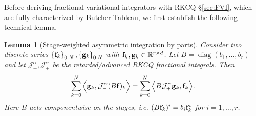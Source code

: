 \documentclass[a4paper,10pt,reqno]{amsart}
\newtheorem{lemma}{Lemma}[section]
\theoremstyle{definition}
\newcommand{\R}{\mathbb{R}}      %
\DeclareMathOperator{\diag}{diag}
\begin{document}
Before deriving fractional variational integrators with RKCQ \S\ref{sec:FVI}, which are fully characterized by Butcher Tableau, we first establish the following technical lemma.  
\begin{lemma}[Stage-weighted asymmetric integration by parts]\label{ConvPropertiesRK2}
Consider two discrete series $\left\{ {\bf f}_k\right\}_{ 0:N}, \left\{ {\bf g}_k\right\}_{0:N}$ with ${\bf f}_k,{\bf g}_k\in \R^{r\times d}$. Let $B=\diag(b_1,\ldots,b_r)$ and let $\mathcal{J}_{-}^{\alpha},\mathcal{J}_{+}^{\alpha}$ be the retarded/advanced RKCQ fractional integrals. Then
\begin{equation}\label{AsymmetricInt:3}
\sum_{k=0}^{N}\Big\langle {\bf g}_k, \mathcal{J}_{-}^{\alpha}(B{\bf f })_k\Big\rangle=\sum_{k=0}^{N}\Big\langle B\mathcal{J}_{+}^{\alpha}{\bf g}_k, {\bf f }_k\Big\rangle.
\end{equation}
Here $B$ acts componentwise on the stages, i.e. $(B {\bf f }_k)^i=b_i {\bf f }_k^i$ for $i=1,\dots,r$.
\end{lemma}
\end{document}
